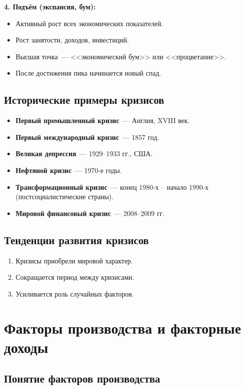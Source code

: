 \documentclass[12pt]{article}
\begin{document}
	\noindent \textbf{4. Подъём (экспансия, бум):}
	\begin{itemize}
		\item Активный рост всех экономических показателей.
		\item Рост занятости, доходов, инвестиций.
		\item Высшая точка~--- <<экономический бум>> или <<процветание>>.
		\item После достижения пика начинается новый спад.
	\end{itemize}
	
	\subsection{Исторические примеры кризисов}
	\begin{itemize}
		\item \textbf{Первый промышленный кризис}~--- Англия, XVIII век.
		\item \textbf{Первый международный кризис}~--- 1857 год.
		\item \textbf{Великая депрессия}~--- 1929--1933 гг., США.
		\item \textbf{Нефтяной кризис}~--- 1970-е годы.
		\item \textbf{Трансформационный кризис}~--- конец 1980-х -- начало 1990-х (постсоциалистические страны).
		\item \textbf{Мировой финансовый кризис}~--- 2008--2009 гг.
	\end{itemize}
	
	\subsection{Тенденции развития кризисов}
	\begin{enumerate}
		\item Кризисы приобрели мировой характер.
		\item Сокращается период между кризисами.
		\item Усиливается роль случайных факторов.
	\end{enumerate}
	
	\section{Факторы производства и факторные доходы}
	
	\subsection{Понятие факторов производства}
	
\end{document}
